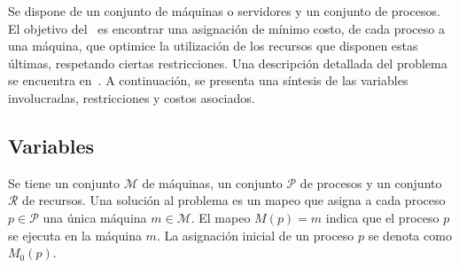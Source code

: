 \documentclass[../informe2.tex]{subfiles}
\begin{document}
Se dispone de un conjunto  de máquinas o servidores y un conjunto de procesos. El objetivo del \mrp\ es encontrar una asignación de mínimo costo, de cada proceso a una máquina, que optimice la utilización de los recursos que disponen estas últimas, respetando ciertas restricciones. Una descripción detallada del problema se encuentra en~\cite{2012ProblemDefinition}. A continuación, se presenta una síntesis de las variables involucradas, restricciones y costos asociados.

\subsection{Variables}
Se tiene un conjunto $\mathcal{M}$ de máquinas, un conjunto $\mathcal{P}$ de procesos y un conjunto $\mathcal{R}$ de recursos. Una solución al problema es un mapeo que asigna a cada proceso $p \in \mathcal{P}$ una única máquina $m \in \mathcal{M}$. El mapeo $M(p) = m$ indica que el proceso $p$ se ejecuta en la máquina $m$. La asignación inicial de un proceso $p$ se denota como $M_0(p)$.
\end{document}
